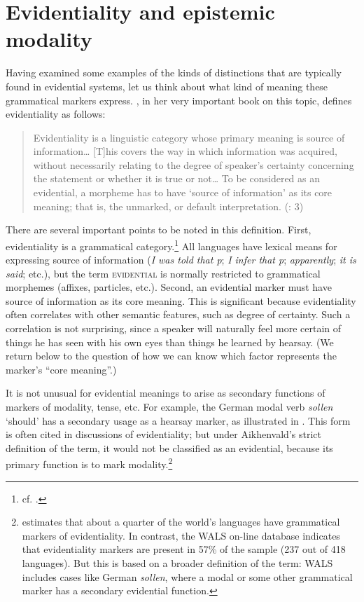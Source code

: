 \section{Evidentiality and epistemic modality}\label{sec:17.3}

Having examined some examples of the kinds of distinctions that are typically found in evidential systems, let us think about what kind of meaning these grammatical markers express. \citet{Aikhenvald2004}, in her very important book on this topic, defines evidentiality as follows:


\begin{quote}
Evidentiality is a linguistic category whose primary meaning is source of information… [T]his covers the way in which information was acquired, without necessarily relating to the degree of speaker’s certainty concerning the statement or whether it is true or not… To be considered as an evidential, a morpheme has to have ‘source of information’ as its core meaning; that is, the unmarked, or default interpretation.  (\citealt{Aikhenvald2004}: 3)
\end{quote}


There are several important points to be noted in this definition. First, evidentiality is a grammatical category.\footnote{cf. \citet[1]{Aikhenvald2004}.} All languages have lexical means for expressing source of information (\textit{I was told that p}; \textit{I infer that p}; \textit{apparently}; \textit{it is said}; etc.), but the term \textsc{evidential} is normally restricted to grammatical morphemes (affixes, particles, etc.). Second, an evidential marker must have source of information as its core meaning. This is significant because evidentiality often correlates with other semantic features, such as degree of certainty. Such a correlation is not surprising, since a speaker will naturally feel more certain of things he has seen with his own eyes than things he learned by hearsay. (We return below to the question of how we can know which factor represents the marker’s “core meaning”.)



It is not unusual for evidential meanings to arise as secondary functions of markers of modality, tense, etc. For example, the German modal verb \textit{sollen} ‘should’ has a secondary usage as a hearsay marker, as illustrated in . This form is often cited in discussions of evidentiality; but under Aikhenvald’s strict definition of the term, it would not be classified as an evidential, because its primary function is to mark modality.\footnote{\citet[1]{Aikhenvald2004} estimates that about a quarter of the world’s languages have grammatical markers of evidentiality. In contrast, the WALS on-line database indicates that evidentiality markers are present in 57\% of the sample (237 out of 418 languages). But this is based on a broader definition of the term: WALS includes cases like German \textit{sollen}, where a modal or some other grammatical marker has a secondary evidential function.}


